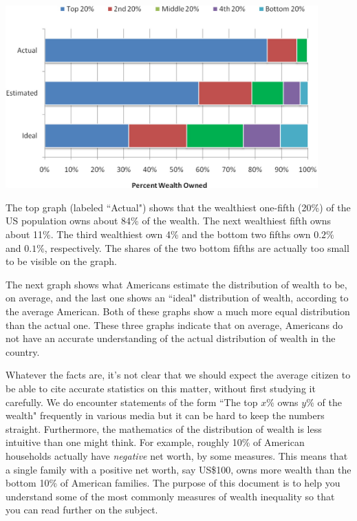 \documentclass[12pt]{memoir}\usepackage[]{graphicx}\usepackage[table]{xcolor}
\begin{document}
\begin{center}
\includegraphics[width = 12cm]{graphs/bargraph.jpeg}
\end{center}

The top graph (labeled ``Actual") shows that the wealthiest one-fifth (20\%) of the US population owns
about 84\% of the wealth.  The next wealthiest fifth owns about 11\%.  The third
wealthiest own 4\% and the bottom two fifths own $0.2\%$ and $0.1\%$, respectively. 
The shares of the two bottom fifths are actually too small to be visible on the graph.

The next graph shows what Americans estimate the distribution of wealth to be,
on average, and the last one shows an ``ideal" distribution of wealth, according
to the average American.  Both of these graphs show a much more equal distribution
than the actual one. These three graphs indicate that on average, Americans
do not have an accurate understanding of the actual distribution of wealth in 
the country. 

Whatever the facts are, it's not clear that we should expect the average citizen 
to be able to cite accurate statistics on this matter, without first studying it 
carefully.  We do encounter statements of the form ``The top $x\%$ owns $y\%$ of the wealth"
frequently in various media but it can be hard to keep the numbers straight.  
Furthermore, the mathematics of the distribution of wealth is less intuitive
than one might think.  For example, roughly 10\% of American households
actually have \emph{negative} net worth, by some measures.  This means that a single 
family with a positive net worth, say US\$100, owns more wealth than the bottom 10\% of 
American families.  The purpose of this document is to help you understand some of the 
most commonly measures of wealth inequality so that you can read further on the subject.
\end{document}
